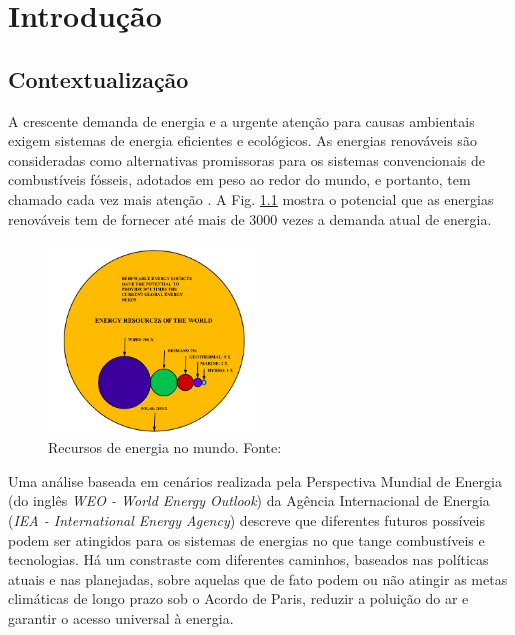 \chapter [Introdução]{Introdução}

\section{Contextualização}


A crescente demanda de energia e a urgente atenção para causas ambientais exigem sistemas de energia eficientes e ecológicos. 
As energias renováveis são consideradas como alternativas promissoras para os sistemas convencionais de combustíveis fósseis, adotados em peso ao redor do mundo, e portanto, tem chamado cada vez mais atenção \cite{Guo2018}.
A Fig. \ref{fig:energy-resources} mostra o potencial que as energias renováveis tem de fornecer até mais de 3000 vezes a demanda atual de energia.

\begin{figure}[!hbt]
	\begin{center}
    \includegraphics[width=0.5\textwidth]{figuras/Energy_Resources_of_The_World.png}
    \caption{Recursos de energia no mundo. Fonte: \cite{Ellabban2014}}
    \label{fig:energy-resources}
    \end{center}
\end{figure}

Uma análise baseada em cenários realizada pela Perspectiva Mundial de Energia (do inglês \textit{WEO - World Energy Outlook}) da Agência Internacional de Energia (\textit{IEA - International Energy Agency}) descreve que diferentes futuros possíveis podem ser atingidos para os sistemas de energias no que tange combustíveis e tecnologias.
Há um constraste com diferentes caminhos, baseados nas políticas atuais e nas planejadas, sobre aquelas que de fato podem ou não atingir as metas climáticas de longo prazo sob o Acordo de Paris, reduzir a poluição do ar e garantir o acesso universal à energia. 

